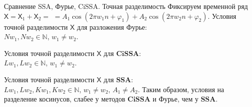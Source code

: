 \documentclass[notheorems, handout]{beamer}
\newcommand{\SSA}{\textbf{SSA}}
\newcommand{\CISSA}{\textbf{CiSSA}}
\newcommand{\TS}{\mathsf{X}}
\begin{document}
		
		
	
		
	
	\begin{frame}{Сравнение SSA, Фурье, CiSSA. Точная разделимость}
		Фиксируем временной ряд $\TS = \TS_{1} + \TS_{2} =$ $= A_1 \cos(2\pi w_1 n + \varphi_1) + A_2 \cos(2\pi w_2 n + \varphi_2)$.
		\newline \newline
		Условия точной разделимости $\TS$ для разложения Фурье: \\
		$Nw_1, Nw_2 \in \mathbb{N}$, $w_1 \not = w_2$.
		
		Условия точной разделимости $\TS$ для $\CISSA$: \\
		$Lw_1, Lw_2 \in \mathbb{N}$, $w_1 \not = w_2$.
		
		Условия точной разделимости $\TS$ для $\SSA$: \\
		$Lw_1, Lw_2, Kw_1, Kw_2 \in \mathbb{N}$, $w_1 \not = w_2$, $A_1 \not = A_2$.
		\newline \newline
		Таким образом, условия на разделение косинусов, слабее у методов $\CISSA$ и Фурье, чем у $\SSA$.
	\end{frame}
	
\end{document}

